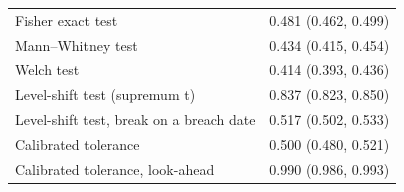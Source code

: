 \begin{table}[htbp]
\begin{tabular}{p{4.6cm}c}
Fisher exact test & 0.481 (0.462, 0.499) \\
Mann--Whitney test & 0.434 (0.415, 0.454) \\
Welch test & 0.414 (0.393, 0.436) \\
Level-shift test (supremum t) & 0.837 (0.823, 0.850) \\
Level-shift test, break on a breach date & 0.517 (0.502, 0.533) \\
Calibrated tolerance & 0.500 (0.480, 0.521) \\
Calibrated tolerance, look-ahead & 0.990 (0.986, 0.993) \\
\bottomrule
\end{tabular}
\end{table}
